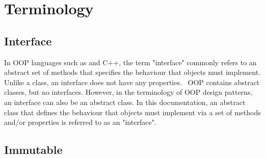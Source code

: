 \section{Terminology}
\subsection*{Interface} \label{sec:interface}
In OOP languages such as \java and C++, the term "interface" commonly refers to an abstract set of methods that specifies the behaviour that objects must implement. Unlike a class, an interface does not have any properties. \matlab\ OOP contains abstract classes, but no interfaces. However, in the terminology of OOP design patterns, an interface can also be an abstract class. In this documentation, an abstract class that defines the behaviour that objects must implement via a set of methods and/or properties is referred to as an "interface".
\subsection*{Immutable}
